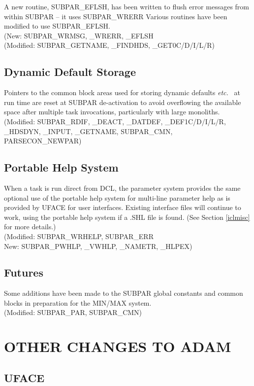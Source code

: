 A new routine, SUBPAR\_EFLSH, has been written to flush error messages from
within SUBPAR -- it uses SUBPAR\_WRERR
Various routines have been modified to use SUBPAR\_EFLSH.\\
(New: SUBPAR\_WRMSG, \_WRERR, \_EFLSH\\
(Modified: SUBPAR\_GETNAME, \_FINDHDS, \_GET0C/D/I/L/R)

\subsection{Dynamic Default Storage}
Pointers to the common block areas used for storing dynamic defaults 
{\em etc.\ }
at run time are reset at SUBPAR de-activation to avoid overflowing the 
available space after multiple task invocations, particularly with large
monoliths.\\
(Modified: SUBPAR\_RDIF, \_DEACT, \_DATDEF, \_DEF1C/D/I/L/R, \_HDSDYN, \_INPUT,
\_GETNAME, SUBPAR\_CMN, PARSECON\_NEWPAR)

\subsection{Portable Help System}
\label{porthelp}
When a task is run direct from DCL, the parameter system provides the same
optional use of the portable help system for multi-line parameter help as is
provided by UFACE for user interfaces.
Existing interface files will continue to work, using the portable help system
if a .SHL file is found. (See Section \ref{iclmisc} for more details.)\\
(Modified: SUBPAR\_WRHELP, SUBPAR\_ERR\\
New: SUBPAR\_PWHLP, \_VWHLP, \_NAMETR, \_HLPEX)

\subsection{Futures}
Some additions have been made to the SUBPAR global constants and common blocks
in preparation for the MIN/MAX system.\\
(Modified: SUBPAR\_PAR, SUBPAR\_CMN)

\section{OTHER CHANGES TO ADAM}

\subsection{UFACE}
